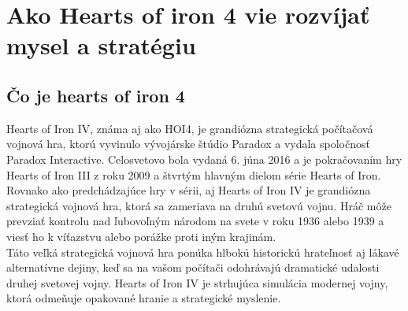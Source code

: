 \documentclass[10pt,oneside,slovak,a4paper]{article}
\begin{document}
\section{Ako Hearts of iron 4 vie rozvíjať mysel a stratégiu}
\subsection{Čo je hearts of iron 4}
Hearts of Iron IV, známa aj ako HOI4, je grandiózna strategická počítačová vojnová hra, ktorú vyvinulo vývojárske štúdio Paradox a vydala spoločnosť Paradox Interactive. Celosvetovo bola vydaná 6. júna 2016 a je pokračovaním hry Hearts of Iron III z roku 2009 a štvrtým hlavným dielom série Hearts of Iron. Rovnako ako predchádzajúce hry v sérii, aj Hearts of Iron IV je grandiózna strategická vojnová hra, ktorá sa zameriava na druhú svetovú vojnu. Hráč môže prevziať kontrolu nad ľubovoľným národom na svete v roku 1936 alebo 1939 a viesť ho k víťazstvu alebo porážke proti iným krajinám.\\

Táto veľká strategická vojnová hra ponúka hlbokú historickú hrateľnosť aj lákavé alternatívne dejiny, keď sa na vašom počítači odohrávajú dramatické udalosti druhej svetovej vojny. Hearts of Iron IV je strhujúca simulácia modernej vojny, ktorá odmeňuje opakované hranie a strategické myslenie.\\
\end{document}
